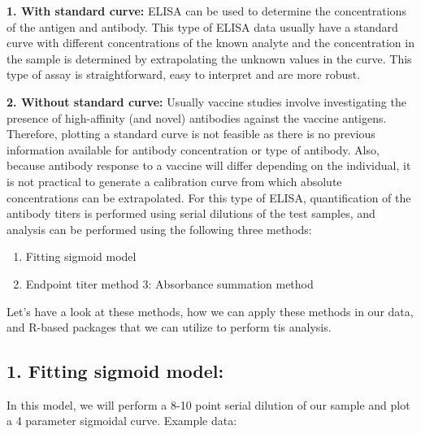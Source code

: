 \documentclass[
]{book}
\providecommand{\tightlist}{%
  \setlength{\itemsep}{0pt}\setlength{\parskip}{0pt}}
\begin{document}
\textbf{1. With standard curve:} ELISA can be used to determine the concentrations of the antigen and antibody. This type of ELISA data usually have a standard curve with
different concentrations of the known analyte and the concentration in the sample is determined by extrapolating the unknown values in the curve. This type of assay is straightforward, easy to interpret and are more robust.

\textbf{2. Without standard curve:} Usually vaccine studies involve investigating the presence of high-affinity (and novel) antibodies against the vaccine antigens.
Therefore, plotting a standard curve is not feasible as there is no previous information available for antibody concentration or type of antibody. Also, because antibody response to a vaccine will differ depending on the individual,
it is not practical to generate a calibration curve from which absolute concentrations can be extrapolated.
For this type of ELISA, quantification of the antibody titers is performed using serial dilutions of the test samples, and analysis can be performed using the following three methods:

\begin{enumerate}
\def\labelenumi{\arabic{enumi}.}
\tightlist
\item
  Fitting sigmoid model
\item
  Endpoint titer method
  3: Absorbance summation method
\end{enumerate}

Let's have a look at these methods, how we can apply these methods in our data, and R-based packages that we can utilize to perform tis analysis.

\hypertarget{fitting-sigmoid-model}{%
\subsection{\texorpdfstring{\textbf{1. Fitting sigmoid model:}}{1. Fitting sigmoid model:}}\label{fitting-sigmoid-model}}

In this model, we will perform a 8-10 point serial dilution of our sample and plot a 4 parameter sigmoidal curve. Example data:
\end{document}

